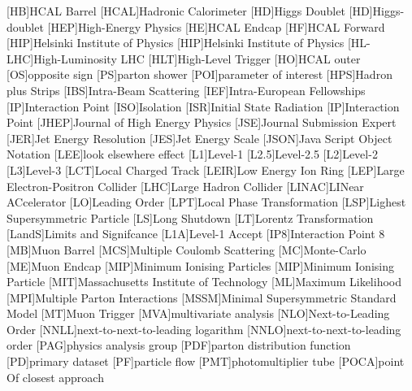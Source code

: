 \begin{acronym}
  [HB]{HCAL Barrel}
  [HCAL]{Hadronic Calorimeter}
  [HD]{Higgs Doublet}
  [HD]{Higgs-doublet}
  [HEP]{High-Energy Physics}
  [HE]{HCAL Endcap}
  [HF]{HCAL Forward}
  [HIP]{Helsinki Institute of Physics}
  [HIP]{Helsinki Institute of Physics}
  [HL-LHC]{High-Luminosity LHC}
  [HLT]{High-Level Trigger}
  [HO]{HCAL outer}
  [OS]{opposite sign}
  [PS]{parton shower}
  [POI]{parameter of interest}
  [HPS]{Hadron plus Strips}
  [IBS]{Intra-Beam Scattering}
  [IEF]{Intra-European Fellowships}
  [IP]{Interaction Point}
  [ISO]{Isolation}
  [ISR]{Initial State Radiation}
  [IP]{Interaction Point}
  [JHEP]{Journal of High Energy Physics}
  [JSE]{Journal Submission Expert}
  [JER]{Jet Energy Resolution}
  [JES]{Jet Energy Scale}
  [JSON]{Java Script Object Notation}
  [LEE]{look elsewhere effect}
  [L1]{Level-1}
  [L2.5]{Level-2.5}
  [L2]{Level-2}
  [L3]{Level-3}
  [LCT]{Local Charged Track}
  [LEIR]{Low Energy Ion Ring}
  [LEP]{Large Electron-Positron Collider}
  [LHC]{Large Hadron Collider}
  [LINAC]{LINear ACcelerator}
  [LO]{Leading Order}
  [LPT]{Local Phase Transformation}
  [LSP]{Lighest Supersymmetric Particle}
  [LS]{Long Shutdown}
  [LT]{Lorentz Transformation}
  [LandS]{Limits and Signifcance}
  [L1A]{Level-1 Accept}
  [IP8]{Interaction Point 8}
  [MB]{Muon Barrel}
  [MCS]{Multiple Coulomb Scattering}
  [MC]{Monte-Carlo}
  [ME]{Muon Endcap}
  [MIP]{Minimum Ionising Particles}
  [MIP]{Minimum Ionising Particle}
  [MIT]{Massachusetts Institute of Technology}
  [ML]{Maximum Likelihood}
  [MPI]{Multiple Parton Interactions}
  [MSSM]{Minimal Supersymmetric Standard Model}
  [MT]{Muon Trigger}
  [MVA]{multivariate analysis}
  [NLO]{Next-to-Leading Order}
  [NNLL]{next-to-next-to-leading logarithm}
  [NNLO]{next-to-next-to-leading order}
  [PAG]{physics analysis group}
  [PDF]{parton distribution function}
  [PD]{primary dataset}
  [PF]{particle flow}
  [PMT]{photomultiplier tube}
  [POCA]{point Of closest approach}

\end{acronym}
